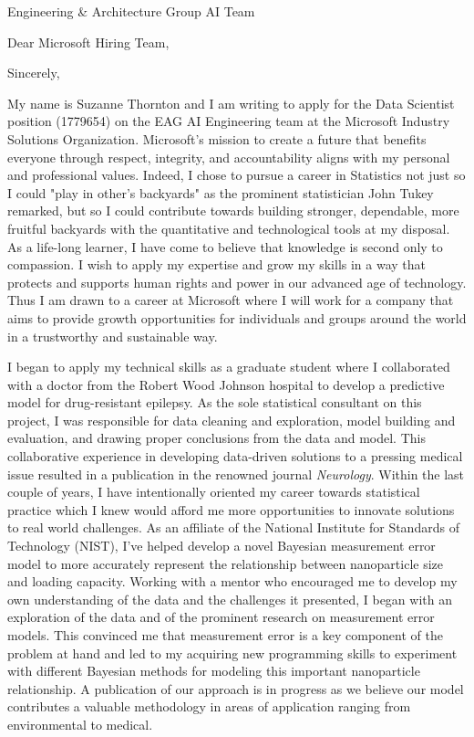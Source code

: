 \documentclass[11pt,a4paper,sans]{moderncv}
\begin{document}
	
	{Engineering \& Architecture Group AI Team}
	\date{\today }
	\opening{Dear Microsoft Hiring Team,}
	\closing{Sincerely,}
	\makelettertitle
	
	My name is Suzanne Thornton and I am writing to apply for the Data Scientist position (1779654) on the EAG AI Engineering team at the Microsoft Industry Solutions Organization. Microsoft's mission to create a future that benefits everyone through respect, integrity, and accountability aligns with my personal and professional values. Indeed, I chose to pursue a career in Statistics not just so I could "play in other's backyards" as the prominent statistician John Tukey remarked, but so I could contribute towards building stronger, dependable, more fruitful backyards with the quantitative and technological tools at my disposal. As a life-long learner, I have come to believe that knowledge is second only to compassion. I wish to apply my expertise and grow my skills in a way that protects and supports human rights and power in our advanced age of technology. Thus I am drawn to a career at Microsoft where I will work for a company that aims to provide growth opportunities for individuals and groups around the world in a trustworthy and sustainable way.  

	I began to apply my technical skills as a graduate student where I collaborated with a doctor from the Robert Wood Johnson hospital to develop a predictive model for drug-resistant epilepsy. As the sole statistical consultant on this project, I was responsible for data cleaning and exploration, model building and evaluation, and drawing proper conclusions from the data and model. This collaborative experience in developing data-driven solutions to a pressing medical issue resulted in a publication in the renowned journal \emph{Neurology}. Within the last couple of years, I have intentionally oriented my career towards statistical practice which I knew would afford me more opportunities to innovate solutions to real world challenges. As an affiliate of the National Institute for Standards of Technology (NIST), I've helped develop a novel Bayesian measurement error model to more accurately represent the relationship between nanoparticle size and loading capacity. Working with a mentor who encouraged me to develop my own understanding of the data and the challenges it presented, I began with an exploration of the data and of the prominent research on measurement error models. This convinced me that measurement error is a key component of the problem at hand and led to my acquiring new programming skills to experiment with different Bayesian methods for modeling this important nanoparticle relationship. A publication of our approach is in progress as we believe our model contributes a valuable methodology in areas of application ranging from environmental to medical.    
\end{document}
